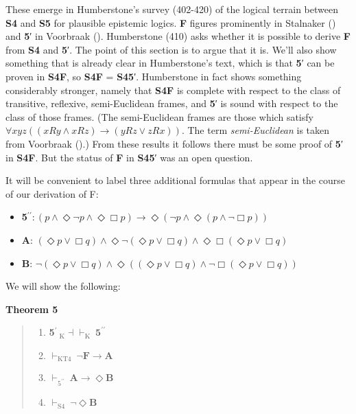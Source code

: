 \documentclass[
  11pt,
  letterpaper,
  DIV=11,
  numbers=noendperiod,
  twoside]{scrartcl}
\providecommand{\tightlist}{%
  \setlength{\itemsep}{0pt}\setlength{\parskip}{0pt}}\usepackage{longtable,booktabs,array}
\begin{document}
These emerge in Humberstone's survey (402-420) of the logical terrain
between \textbf{S4} and \textbf{S5} for plausible epistemic logics.
\textbf{F} figures prominently in Stalnaker
() and \textbf{5}′ in Voorbraak
(). Humberstone (410) asks whether it
is possible to derive \textbf{F} from \textbf{S4} and \textbf{5}′. The
point of this section is to argue that it is. We'll also show something
that is already clear in Humberstone's text, which is that \textbf{5}′
can be proven in \textbf{S4F}, so \textbf{S4F} = \textbf{S45}′.
Humberstone in fact shows something considerably stronger, namely that
\textbf{S4F} is complete with respect to the class of transitive,
reflexive, semi-Euclidean frames, and \textbf{5}′ is sound with respect
to the class of those frames. (The semi-Euclidean frames are those which
satisfy \(\forall xyz((xRy \wedge xRz) \rightarrow (yRz \vee zRx))\).
The term \emph{semi-Euclidean} is taken from Voorbraak
().) From these results it follows
there must be some proof of \textbf{5}′ in \textbf{S4F}. But the status
of \textbf{F} in \textbf{S45}′ was an open question.

It will be convenient to label three additional formulas that appear in
the course of our derivation of F:

\begin{itemize}
\tightlist
\item
  \textbf{5}\(^{\prime\prime}\!: (p \wedge \Diamond\neg p \wedge \Diamond\Box p) \rightarrow \Diamond(\neg p \wedge \Diamond(p\wedge \neg \Box p))\)
\item
  \textbf{A}:
  \((\Diamond{p}\vee \Box q) \wedge \Diamond\neg (\Diamond{p}\vee \Box q) \wedge \Diamond\Box (\Diamond{p}\vee \Box q)\)
\item
  \textbf{B}:
  \(\neg (\Diamond{p}\vee \Box q) \wedge \Diamond((\Diamond{p}\vee \Box q) \wedge \neg \Box (\Diamond{p}\vee \Box q))\)
\end{itemize}

We will show the following:

\textbf{Theorem 5}

\begin{quote}
\begin{enumerate}
\def\labelenumi{\roman{enumi}.}
\tightlist
\item
  \textbf{5}\(^{\prime}~_{\text{K}}\!{\dashv}{\vdash}_\text{K}~\textbf{5}^{\prime\prime}\)
\item
  \(\vdash_\text{KT4} ~ \neg \textbf{F}\rightarrow \textbf{A}\)
\item
  \(\vdash_{\text{5}^{\prime\prime}} ~\textbf{A}\rightarrow \Diamond\textbf{B}\)
\item
  \(\vdash_\text{S4} ~\neg \Diamond\textbf{B}\)
\end{enumerate}
\end{quote}
\end{document}
